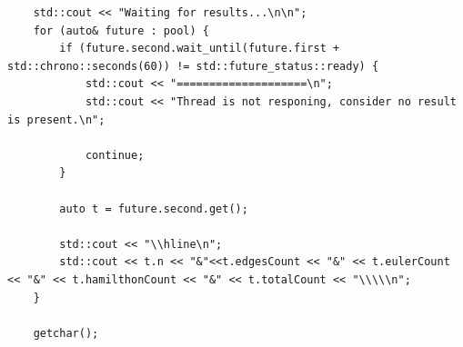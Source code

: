 \documentclass[a4paper,14pt]{extarticle}
\begin{document}
\begin{enumerate}[1.]
\begin{verbatim}
    std::cout << "Waiting for results...\n\n";
    for (auto& future : pool) {
        if (future.second.wait_until(future.first + std::chrono::seconds(60)) != std::future_status::ready) {
            std::cout << "====================\n";
            std::cout << "Thread is not responing, consider no result is present.\n";

            continue;
        }

        auto t = future.second.get();

        std::cout << "\\hline\n";
        std::cout << t.n << "&"<<t.edgesCount << "&" << t.eulerCount << "&" << t.hamilthonCount << "&" << t.totalCount << "\\\\\n";
    }

    getchar();


\end{verbatim}
\end{enumerate}
\end{document}
